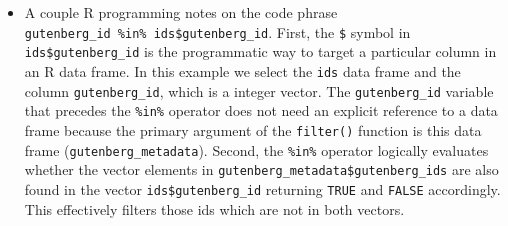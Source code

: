 \documentclass[
]{article}
\newenvironment{Shaded}{\begin{snugshade}}{\end{snugshade}}
\newcommand{\CommentTok}[1]{\textcolor[rgb]{0.56,0.35,0.01}{\textit{#1}}}
\newcommand{\ConstantTok}[1]{\textcolor[rgb]{0.00,0.00,0.00}{#1}}
\newcommand{\FunctionTok}[1]{\textcolor[rgb]{0.00,0.00,0.00}{#1}}
\newcommand{\NormalTok}[1]{#1}
\newcommand{\OtherTok}[1]{\textcolor[rgb]{0.56,0.35,0.01}{#1}}
\newcommand{\SpecialCharTok}[1]{\textcolor[rgb]{0.00,0.00,0.00}{#1}}
\newenvironment{rmdblock}[1]
  {\begin{shaded*}
  \begin{itemize}
  \renewcommand{\labelitemi}{
    \raisebox{-.5\height}[0pt][0pt]{
      {\setkeys{Gin}{width=2em,keepaspectratio}\texttt{[image: assets/images/\#1]}}
    }
  }
  \item
  }
  {
  \end{itemize}
  \end{shaded*}
  }
\newenvironment{rmdtip}
  {\begin{rmdblock}{tip}}
  {\end{rmdblock}}
\begin{document}
\begin{Shaded}
\end{Shaded}

\begin{rmdtip}
A couple R programming notes on the code phrase \texttt{gutenberg\_id\ \%in\%\ ids\$gutenberg\_id}. First, the \texttt{\$} symbol in \texttt{ids\$gutenberg\_id} is the programmatic way to target a particular column in an R data frame. In this example we select the \texttt{ids} data frame and the column \texttt{gutenberg\_id}, which is a integer vector. The \texttt{gutenberg\_id} variable that precedes the \texttt{\%in\%} operator does not need an explicit reference to a data frame because the primary argument of the \texttt{filter()} function is this data frame (\texttt{gutenberg\_metadata}). Second, the \texttt{\%in\%} operator logically evaluates whether the vector elements in \texttt{gutenberg\_metadata\$gutenberg\_ids} are also found in the vector \texttt{ids\$gutenberg\_id} returning \texttt{TRUE} and \texttt{FALSE} accordingly. This effectively filters those ids which are not in both vectors.
\end{rmdtip}
\end{document}
